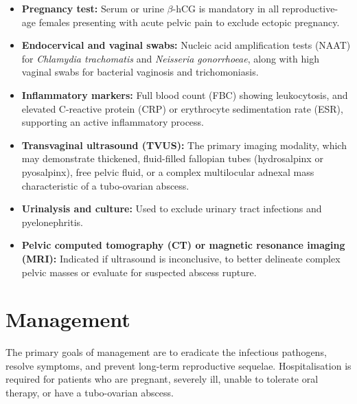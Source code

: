 \begin{itemize}
    \item \textbf{Pregnancy test:} Serum or urine $\beta$-hCG is mandatory in all reproductive-age females presenting with acute pelvic pain to exclude ectopic pregnancy.
    \item \textbf{Endocervical and vaginal swabs:} Nucleic acid amplification tests (NAAT) for \textit{Chlamydia trachomatis} and \textit{Neisseria gonorrhoeae}, along with high vaginal swabs for bacterial vaginosis and trichomoniasis.
    \item \textbf{Inflammatory markers:} Full blood count (FBC) showing leukocytosis, and elevated C-reactive protein (CRP) or erythrocyte sedimentation rate (ESR), supporting an active inflammatory process.
    \item \textbf{Transvaginal ultrasound (TVUS):} The primary imaging modality, which may demonstrate thickened, fluid-filled fallopian tubes (hydrosalpinx or pyosalpinx), free pelvic fluid, or a complex multilocular adnexal mass characteristic of a tubo-ovarian abscess.
    \item \textbf{Urinalysis and culture:} Used to exclude urinary tract infections and pyelonephritis.
    \item \textbf{Pelvic computed tomography (CT) or magnetic resonance imaging (MRI):} Indicated if ultrasound is inconclusive, to better delineate complex pelvic masses or evaluate for suspected abscess rupture.
\end{itemize}

\section*{Management}
The primary goals of management are to eradicate the infectious pathogens, resolve symptoms, and prevent long-term reproductive sequelae. Hospitalisation is required for patients who are pregnant, severely ill, unable to tolerate oral therapy, or have a tubo-ovarian abscess.

